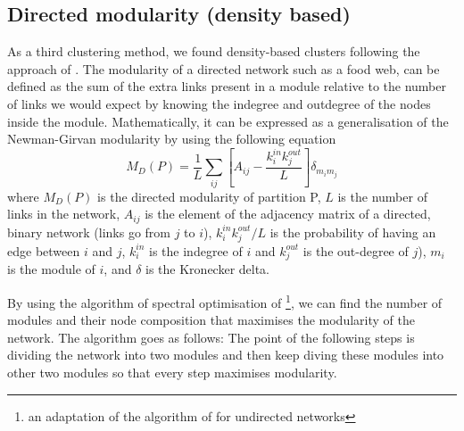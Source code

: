 \documentclass[twocolumn]{article}
\begin{document}
    \subsection*{Directed modularity (density based)}
        As a third clustering method, we found density-based clusters following the approach of \citet{Guimera2010}. The modularity of a directed network such as a food web, can be defined as the sum of the extra links present in a module relative to the number of links we would expect by knowing the indegree and outdegree of the nodes inside the module. Mathematically, it can be expressed as a generalisation of the Newman-Girvan modularity \citep{Newman2004} by using the following equation \citep{Arenas2007}
        \begin{equation}
            M_D(P)=\frac{1}{L}\sum\limits_{ij}[A_{ij}-\frac{k_i^{in}k_j^{out}}{L}]\delta_{m_im_j}
            \label{eqn:modularitydensity}
        \end{equation}
        \noindent where $M_D(P)$ is the directed modularity of partition P, $L$ is the number of links in the network, $A_{ij}$ is the element of the adjacency matrix of a directed, binary network (links go from $j$ to $i$), $k_i^{in}k_j^{out}/L$ is the probability of having an edge between $i$ and $j$, $k^{in}_i$ is the indegree of $i$ and $k^{out}_j$ is the out-degree of $j$), $ m_i$ is the module of $i$, and $\delta$ is the Kronecker delta. 
        \par By using the algorithm of spectral optimisation of \citet{Leicht2008} \footnote{an adaptation of the algorithm of \citet{Newman2006} for undirected networks}, we can find the number of modules and their node composition that maximises the modularity of the network. The algorithm goes as follows:
        \bigskip
        The point of the following steps is dividing the network into two modules and then keep diving these modules into other two modules so that every step maximises modularity.
\end{document}
